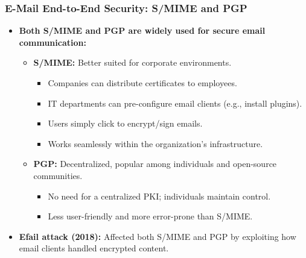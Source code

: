 \subsubsection{E-Mail End-to-End Security: S/MIME and PGP}
\begin{itemize}
    \item \textbf{Both S/MIME and PGP are widely used for secure email communication:}
    \begin{itemize}
        \item \textbf{S/MIME:} Better suited for corporate environments.
        \begin{itemize}
            \item Companies can distribute certificates to employees.
            \item IT departments can pre-configure email clients (e.g., install plugins).
            \item Users simply click to encrypt/sign emails.
            \item Works seamlessly within the organization's infrastructure.
        \end{itemize}
        \item \textbf{PGP:} Decentralized, popular among individuals and open-source communities.
        \begin{itemize}
            \item No need for a centralized PKI; individuals maintain control.
            \item Less user-friendly and more error-prone than S/MIME.
        \end{itemize}
    \end{itemize}
    \item \textbf{Efail attack (2018):} Affected both S/MIME and PGP by exploiting how email clients handled encrypted content.
\end{itemize}

